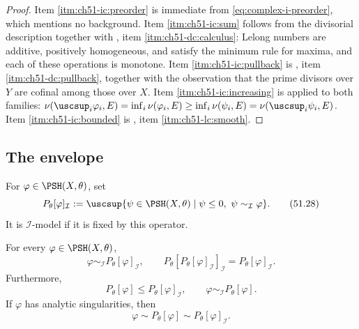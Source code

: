 \begin{proof}
Item \cref{itm:ch51-ic:preorder} is immediate from
\eqref{eq:complex-i-preorder}, which mentions no background.  Item
\cref{itm:ch51-ic:sum} follows from the divisorial description together
with , item
\cref{itm:ch51-dc:calculus}: Lelong numbers are additive, positively
homogeneous, and satisfy the minimum rule for maxima, and each of these
operations is monotone.  Item \cref{itm:ch51-ic:pullback} is
, item \cref{itm:ch51-dc:pullback},
together with the observation that the prime divisors over $Y$ are
cofinal among those over $X$.  Item \cref{itm:ch51-ic:increasing} is
 applied to both families:
$\nu(\uscsup_i\varphi_i,E)=\inf_i\nu(\varphi_i,E)
\geq\inf_i\nu(\psi_i,E)=\nu(\uscsup_i\psi_i,E)$.  Item
\cref{itm:ch51-ic:bounded} is , item
\cref{itm:ch51-lc:smooth}.
\end{proof}

\subsection{The envelope}
\label{sec:ch51-i-envelope-def}

\begin{definition}
\label{def:complex-i-envelope}
For $\varphi\in\PSH(X,\theta)$, set
\[
 P_\theta[\varphi]_{\mathcal I}
 :=\uscsup\{\psi\in\PSH(X,\theta)\mid
          \psi\leq0,\ \psi\sim_{\mathcal I}\varphi\}.
\tag{51.28}\label{eq:complex-i-envelope}
\]
It is $\mathcal I$-model if it is fixed by this operator.
\end{definition}

\begin{theorem}\label{thm:complex-i-projection}
For every $\varphi\in\PSH(X,\theta)$,
\[
 \varphi\sim_{\mathcal I}P_\theta[\varphi]_{\mathcal I},
\qquad
 P_\theta[P_\theta[\varphi]_{\mathcal I}]_{\mathcal I}
      =P_\theta[\varphi]_{\mathcal I}.
\tag{51.29}\label{eq:complex-i-projection}
\]
Furthermore,
\[
 P_\theta[\varphi]\leq P_\theta[\varphi]_{\mathcal I},
\qquad
 \varphi\sim_{\mathcal I}P_\theta[\varphi].
\tag{51.30}\label{eq:complex-p-i-comparison}
\]
If $\varphi$ has analytic singularities, then
\[
 \varphi\sim P_\theta[\varphi]
        \sim P_\theta[\varphi]_{\mathcal I}.
\tag{51.31}\label{eq:complex-analytic-envelope-agreement}
\]
\end{theorem}

